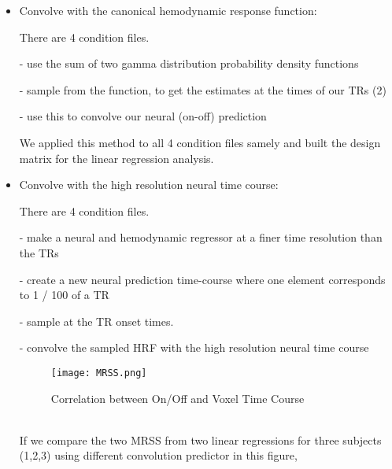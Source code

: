 \begin{itemize}
\item Convolve with the canonical hemodynamic response function:\\
\par There are 4 condition files.\\
\par - use the sum of two gamma distribution probability density functions\\
\par - sample from the function, to get the estimates at the times of our TRs (2)\\
\par - use this to convolve our neural (on-off) prediction\\
\par We applied this method to all 4 condition files samely and built the design matrix for the linear regression analysis. \\


\item Convolve with the high resolution neural time course:\\
\par There are 4 condition files.\\
\par - make a neural and hemodynamic regressor at a finer time resolution than the TRs\\
\par - create a new neural prediction time-course where one element corresponds to 1 / 100 of a TR\\
\par - sample at the TR onset times.
\par - convolve the sampled HRF with the high resolution neural time course\\

\begin{figure}[H]
    \centering
        \texttt{[image: MRSS.png]}
    \caption{Correlation between On/Off and Voxel Time Course}
\end{figure}

\\
If we compare the two MRSS from two linear regressions for three subjects (1,2,3) using different convolution predictor in this figure, 
\end {itemize}
